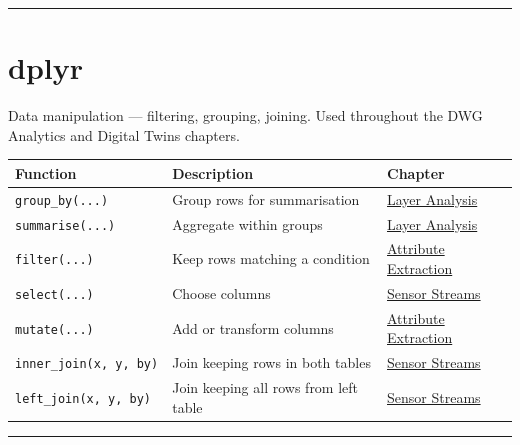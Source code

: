 \documentclass[
  11pt,
  letterpaper,
  DIV=11,
  numbers=noendperiod]{scrreprt}
\begin{document}
\begin{center}\rule{0.5\linewidth}{0.5pt}\end{center}

\section{dplyr}\label{dplyr}

Data manipulation --- filtering, grouping, joining. Used throughout the
DWG Analytics and Digital Twins chapters.

\begin{longtable}[]{@{}
  >{\raggedright\arraybackslash}p{}
  >{\raggedright\arraybackslash}p{}
  >{\raggedright\arraybackslash}p{}@{}}
\toprule\noalign{}
\begin{minipage}[b]{\linewidth}\raggedright
Function
\end{minipage} & \begin{minipage}[b]{\linewidth}\raggedright
Description
\end{minipage} & \begin{minipage}[b]{\linewidth}\raggedright
Chapter
\end{minipage} \\
\midrule\noalign{}
\endhead
\bottomrule\noalign{}
\endlastfoot
\texttt{group\_by(...)} & Group rows for summarisation &
\hyperref[layer-structure-analysis]{Layer Analysis} \\
\texttt{summarise(...)} & Aggregate within groups &
\hyperref[layer-structure-analysis]{Layer Analysis} \\
\texttt{filter(...)} & Keep rows matching a condition &
\hyperref[attribute-extraction]{Attribute Extraction} \\
\texttt{select(...)} & Choose columns &
\hyperref[linking-sensor-streams]{Sensor Streams} \\
\texttt{mutate(...)} & Add or transform columns &
\hyperref[attribute-extraction]{Attribute Extraction} \\
\texttt{inner\_join(x,\ y,\ by)} & Join keeping rows in both tables &
\hyperref[linking-sensor-streams]{Sensor Streams} \\
\texttt{left\_join(x,\ y,\ by)} & Join keeping all rows from left table
& \hyperref[linking-sensor-streams]{Sensor Streams} \\
\end{longtable}

\begin{center}\rule{0.5\linewidth}{0.5pt}\end{center}
\end{document}
